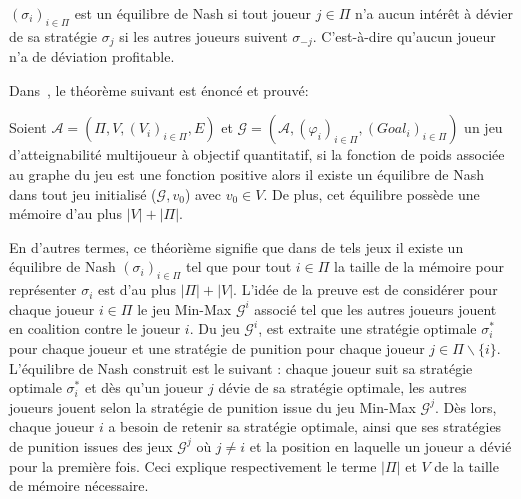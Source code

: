 \begin{rem}
	$(\sigma _{i})_{i\in \Pi}$ est un équilibre de Nash si tout joueur $j \in \Pi$ n'a aucun intérêt à dévier de sa stratégie $\sigma _{j}$ si les autres joueurs suivent $\sigma _{-j}$. C'est-à-dire qu'aucun joueur n'a de déviation profitable. 
\end{rem}





 Dans~\cite{DBLP:conf/lfcs/BrihayePS13}, le théorème suivant est énoncé et prouvé:

\begin{thm}
	Soient $\mathcal{A} = (\Pi, V, (V_{i})_{i \in \Pi}, E)$ et $\mathcal{G} = (\mathcal{A},(\varphi _{i})_{i \in \Pi}, (Goal_{i})_{i \in \Pi})$ un jeu d'atteignabilité multijoueur à objectif quantitatif, si la fonction de poids associée au graphe du jeu est une fonction positive alors il existe un équilibre de Nash dans tout jeu initialisé ($\mathcal{G},v_{0}$) avec $v_{0}\in V$. De plus, cet équilibre possède une mémoire d'au plus $|V| + |\Pi|$.
\end{thm}

En d'autres termes, ce théorième signifie que dans de tels jeux il existe un équilibre de Nash $(\sigma_i)_{i\in \Pi}$ tel que pour tout $i \in \Pi$ la taille de la mémoire pour représenter $\sigma_i$ est d'au plus $|\Pi| + |V|$. L'idée de la preuve est de considérer  pour chaque joueur $i \in \Pi$ le jeu Min-Max $\mathcal{G}^i$ associé tel que les autres joueurs jouent en coalition contre le joueur $i$. Du jeu $\mathcal{G}^i$, est extraite une stratégie optimale $\sigma_i^*$ pour chaque joueur et une stratégie de punition pour chaque joueur $j \in \Pi \backslash \{i\}$. L'équilibre de Nash construit est le suivant : chaque joueur suit sa stratégie optimale $\sigma_i^*$ et dès qu'un joueur $j$ dévie de sa stratégie optimale, les autres joueurs jouent selon la stratégie de punition issue du jeu Min-Max $\mathcal{G}^j$. Dès lors, chaque joueur $i$ a besoin de retenir sa stratégie optimale, ainsi que ses stratégies de punition issues des jeux $\mathcal{G}^j$ où $j \neq i$ et la position en laquelle un joueur a dévié pour la première fois. Ceci explique respectivement le terme $|\Pi|$ et $V$ de la taille de mémoire nécessaire.
